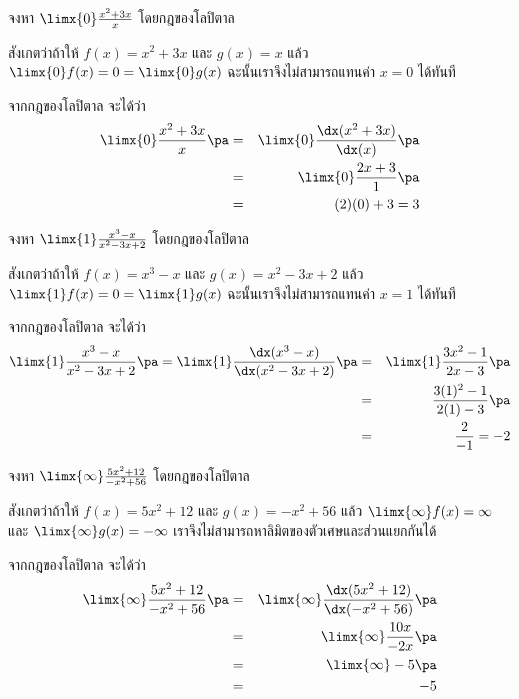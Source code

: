 \begin{frame}[t]
\begin{ex}
จงหา $\limx{0} \frac{x^2+3x}{x}$ โดยกฎของโลปิตาล
\end{ex}\pa 
\begin{sol}
สังเกตว่าถ้าให้ $f(x) = x^2+3x$ และ $g(x) = x$ แล้ว $\limx{0} f(x) = 0 = \limx{0} g(x)$ \pa ฉะนั้นเราจึงไม่สามารถแทนค่า $x=0$ ได้ทันที \pa

จากกฎของโลปิตาล จะได้ว่า
\begin{eqnarray*}
\limx{0} \frac{x^2+3x}{x} \pa &=& \limx{0} \frac{\dx (x^2+3x)}{\dx (x)} \pa \\
&=& \limx{0} \frac{2x+3}{1} \pa \\
&=& (2)(0) + 3 = 3
\end{eqnarray*}
\end{sol}
\end{frame}


\begin{frame}[t]
\begin{ex}
จงหา $\limx{1} \frac{x^3-x}{x^2-3x+2}$ โดยกฎของโลปิตาล
\end{ex}\pa 
\begin{sol}
สังเกตว่าถ้าให้ $f(x) = x^3-x$ และ $g(x) = x^2-3x+2$ แล้ว $\limx{1} f(x) = 0 = \limx{1} g(x)$ \pa ฉะนั้นเราจึงไม่สามารถแทนค่า $x=1$ ได้ทันที \pa

จากกฎของโลปิตาล จะได้ว่า
\begin{eqnarray*}
\limx{1} \frac{x^3-x}{x^2-3x+2} \pa = \limx{1} \frac{\dx (x^3-x)}{\dx (x^2-3x+2)} \pa &=& \limx{1} \frac{3x^2-1}{2x-3} \pa \\
&=& \frac{3(1)^2 - 1}{2(1) - 3} \pa \\
&=& \frac{2}{-1} = -2
\end{eqnarray*}
\end{sol}
\end{frame}


\begin{frame}[t]
\begin{ex}
จงหา $\limx{\infty} \frac{5x^2+12}{-x^2+56}$ โดยกฎของโลปิตาล
\end{ex}\pa 
\begin{sol}
สังเกตว่าถ้าให้ $f(x) = 5x^2+12$ และ $g(x) = -x^2+56$ \pa แล้ว $\limx{\infty} f(x) = \infty$ และ $ \limx{\infty} g(x) = -\infty$ \pa เราจึงไม่สามารถหาลิมิตของตัวเศษและส่วนแยกกันได้

จากกฎของโลปิตาล จะได้ว่า
\begin{eqnarray*}
\limx{\infty} \frac{5x^2+12}{-x^2+56} \pa &=& \limx{\infty} \frac{\dx(5x^2+12)}{\dx (-x^2+56)} \pa \\
&=& \limx{\infty} \frac{10x}{-2x} \pa \\
&=& \limx{\infty} -5 \pa \\
&=& -5
\end{eqnarray*}
\end{sol}
\end{frame}


